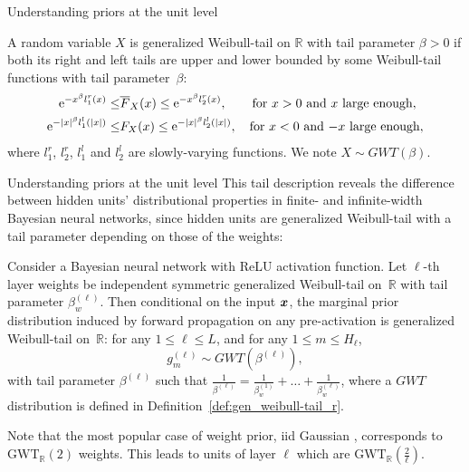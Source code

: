 \documentclass[9pt]{beamer}
\begin{document}
\begin{frame}{Understanding priors at the unit level}
	\begin{definition}
\label{def:gen_weibull-tail_r}
A random variable $X$ is generalized Weibull-tail on $\mathbb{R}$ with tail parameter $\beta > 0$ if both its right and left tails are upper and lower bounded by some Weibull-tail functions with tail parameter~$\beta$:
\begin{align*}
    \mathrm{e}^{-x^{\beta} l_1^r(x)} \le & \overline{F}_X(x) \le \mathrm{e}^{-x^{\beta} l_2^r(x)}, \quad \ \ \ \text{for }x > 0 \text{ and $x$ large enough}, \\
    \mathrm{e}^{-|x|^{\beta} l_1^l(|x|)} \le & F_X(x) \le \mathrm{e}^{-|x|^{\beta} l_2^l(|x|)}, \quad \text{for } x < 0 \text{ and $-x$ large enough},
\end{align*}
where $l_1^r$, $l_2^r$, $l_1^l$ and $l_2^l$ are slowly-varying functions. 
We note $X \sim GWT(\beta)$. 
\end{definition}
\end{frame}

\begin{frame}{Understanding priors at the unit level}
This tail description reveals the difference between hidden units' distributional properties in finite- and infinite-width Bayesian neural networks, since 
hidden units are generalized Weibull-tail with a tail parameter depending on those of the weights:
\begin{theorem}
\label{theorem:hidden_units_are_gwt}
Consider a Bayesian neural network  with ReLU activation function. Let $\ell$-th layer weights be independent symmetric generalized Weibull-tail on~$\mathbb{R}$ with tail parameter $\beta^{(\ell)}_w$. 
Then conditional on the input $\boldsymbol{x}$, the marginal prior distribution induced by forward propagation on any pre-activation is generalized Weibull-tail on~$\mathbb{R}$: for any $1\leq \ell\leq L$, and for any $1\leq m\leq H_\ell$,
$$g_m^{(\ell)}\sim GWT(\beta^{(\ell)}),$$
with tail parameter $\beta^{(\ell)}$ such that $\frac{1}{\beta^{(\ell)}} = \frac{1}{\beta^{(1)}_w} + \dots + \frac{1}{\beta^{(\ell)}_w}$,
where a $GWT$ distribution is defined in Definition~\ref{def:gen_weibull-tail_r}.
\end{theorem}
Note that the most popular case of weight prior, iid Gaussian \citep{neal1996bayesian}, corresponds to $\text{GWT}_{\mathbb{R}}(2)$ weights. This leads to units of layer $\ell$ which are $\text{GWT}_{\mathbb{R}}(\frac{2}{\ell})$. 
\end{frame}
\end{document}
